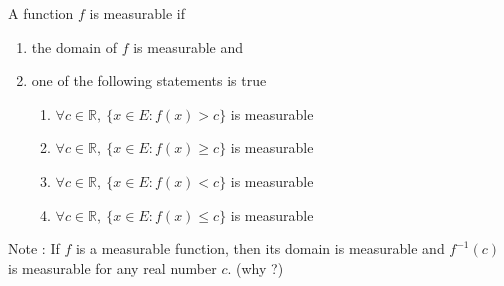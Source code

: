 \begin{definition}
	A function $f$ is measurable if
	\begin{enumerate}
		\item the domain of $f$ is measurable and
		\item one of the following statements is true 
		\begin{enumerate}
			\item $\forall c \in \mathbb{R},\ \{ x \in E : f(x) > c\}$ is measurable
			\item $\forall c \in \mathbb{R},\ \{ x \in E : f(x) \ge c\}$ is measurable
			\item $\forall c \in \mathbb{R},\ \{ x \in E : f(x) < c\}$ is measurable
			\item $\forall c \in \mathbb{R},\ \{ x \in E : f(x) \le c\}$ is measurable
		\end{enumerate}
	\end{enumerate}
\end{definition}

Note : If $f$ is a measurable function, then its domain is measurable and $f^{-1}(c)$ is measurable for any real number $c$. ({\color{blue}why ?})

